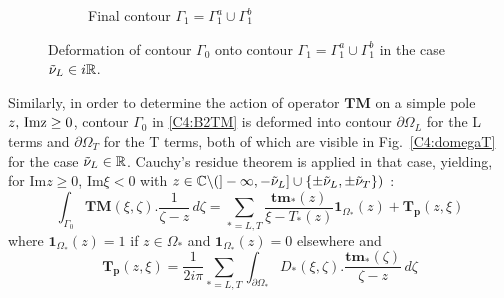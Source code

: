 \begin{figure}
\begin{subfigure}[b]{0.45\textwidth}
\caption{Final contour $\Gamma_1=\Gamma_1^a \cup \Gamma_1^b$}
\label{gamma1crfinal}
\end{subfigure}
\caption{Deformation of contour $\Gamma_0$ onto contour $\Gamma_1=\Gamma_1^a \cup \Gamma_1^b$ in the case $\tilde{\nu}_L \in i\mathbb{R}$.}
\label{C4:gamma1cr}
\end{figure}

Similarly, in order to determine the action of operator $\mathbf{TM}$ on a simple pole $z, \, \rm Im z\geq 0$, contour $\Gamma_0$ in \eqref{C4:B2TM} is deformed into contour $\partial \Omega_L$ for the L terms and $\partial \Omega_T$ for the T terms, both of which are visible in Fig.~\ref{C4:domegaT} for the case $\tilde{\nu}_L \in \mathbb{R}$. Cauchy's residue theorem is applied in that case, yielding, for Im$z\geq 0$, Im$\xi <0 $ with $z\in \mathbb{C} \backslash  (\rbrack - \infty, -\tilde{\nu}_L \rbrack \cup \{\pm \tilde{\nu}_L,\pm \tilde{\nu}_T \})$ :
\begin{equation}
\int_{\Gamma_0} \textbf{TM}(\xi,\zeta).\frac{1}{\zeta-z}\,d\zeta = \sum_{*=L,T} \frac{\textbf{tm}_*(z)}{\xi-T_*(z)}\textbf{1}_{\Omega_*}(z)+\mathbf{T_p}(z,\xi)
\label{C4:GaussTM}
\end{equation}
where $\textbf{1}_{\Omega_*}(z)=1$ if $z\in \Omega_*$ and $\textbf{1}_{\Omega_*}(z)=0$ elsewhere and
\begin{equation}
\mathbf{T_p}(z,\xi)= \frac{1}{2i\pi} \sum_{*=L,T} \int_{\partial \Omega_*} D_*(\xi,\zeta) .\dfrac{\textbf{tm}_*(\zeta)}{\zeta-z}\, d\zeta
\label{C4:defTp}
\end{equation}

